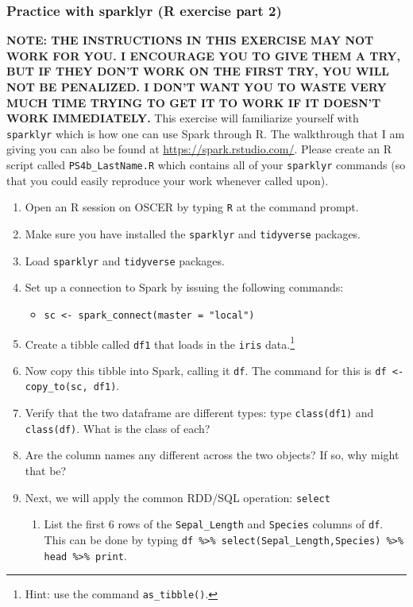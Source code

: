\documentclass[12pt,english]{exam}
\begin{document}
\begin{questions}
\subsubsection*{Practice with sparklyr (R exercise part 2)}
\textbf{NOTE: THE INSTRUCTIONS IN THIS EXERCISE MAY NOT WORK FOR YOU. I ENCOURAGE YOU TO GIVE THEM A TRY, BUT IF THEY DON'T WORK ON THE FIRST TRY, YOU WILL NOT BE PENALIZED. I DON'T WANT YOU TO WASTE VERY MUCH TIME TRYING TO GET IT TO WORK IF IT DOESN'T WORK IMMEDIATELY.}
\question This exercise will familiarize yourself with \texttt{sparklyr} which is how one can use Spark through R. The walkthrough that I am giving you can also be found at \url{https://spark.rstudio.com/}. Please create an R script called \texttt{PS4b\_LastName.R} which contains all of your \texttt{sparklyr} commands (so that you could easily reproduce your work whenever called upon).
\begin{enumerate}
    \item Open an R session on OSCER by typing \texttt{R} at the command prompt.
    \item Make sure you have installed the \texttt{sparklyr} and \texttt{tidyverse} packages.
    \item Load \texttt{sparklyr} and \texttt{tidyverse} packages. 
    \item Set up a connection to Spark by issuing the following commands:
    \begin{itemize}
        \item[] \texttt{sc <- spark\_connect(master = "local")}
    \end{itemize}
    \item Create a tibble called \texttt{df1} that loads in the \texttt{iris} data.\footnote{Hint: use the command \texttt{as\_tibble()}.}
    \item Now copy this tibble into Spark, calling it \texttt{df}. The command for this is \texttt{df  <- copy\_to(sc, df1)}.
    \item Verify that the two dataframe are different types: type \texttt{class(df1)} and \texttt{class(df)}. What is the class of each?
    \item Are the column names any different across the two objects? If so, why might that be?
    \item Next, we will apply the common RDD/SQL operation: \texttt{select}
    \begin{enumerate}
        \item List the first 6 rows of the \texttt{Sepal\_Length} and \texttt{Species} columns of \texttt{df}. This can be done by typing \texttt{df  \%>\% select(Sepal\_Length,Species) \%>\% head \%>\% print}.

\end{enumerate}
\end{enumerate}
\end{questions}
\end{document}
